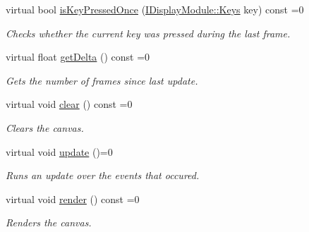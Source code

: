 \begin{DoxyCompactItemize}
virtual bool \mbox{\hyperlink{classArcade_1_1Display_1_1IDisplayModule_a531b700b332e077d9b714bafac05ebe1}{is\+Key\+Pressed\+Once}} (\mbox{\hyperlink{classArcade_1_1Display_1_1IDisplayModule_a8da3f6b309ca0581473ae8cc8789b619}{I\+Display\+Module\+::\+Keys}} key) const =0
\begin{DoxyCompactList}\small\item\em Checks whether the current key was pressed during the last frame. \end{DoxyCompactList}\item 
virtual float \mbox{\hyperlink{classArcade_1_1Display_1_1IDisplayModule_aab078d82e6fdd32682553947c20226ac}{get\+Delta}} () const =0
\begin{DoxyCompactList}\small\item\em Gets the number of frames since last update. \end{DoxyCompactList}\item 
\mbox{\label{classArcade_1_1Display_1_1IDisplayModule_a4892b758c6710f45d4dcebe70f801639}} 
virtual void \mbox{\hyperlink{classArcade_1_1Display_1_1IDisplayModule_a4892b758c6710f45d4dcebe70f801639}{clear}} () const =0
\begin{DoxyCompactList}\small\item\em Clears the canvas. \end{DoxyCompactList}\item 
\mbox{\label{classArcade_1_1Display_1_1IDisplayModule_a1ca0c1052dccb78eb470e36e6f557e60}} 
virtual void \mbox{\hyperlink{classArcade_1_1Display_1_1IDisplayModule_a1ca0c1052dccb78eb470e36e6f557e60}{update}} ()=0
\begin{DoxyCompactList}\small\item\em Runs an update over the events that occured. \end{DoxyCompactList}\item 
\mbox{\label{classArcade_1_1Display_1_1IDisplayModule_a012f5804e7dc45515ef8e85e7ca8de5a}} 
virtual void \mbox{\hyperlink{classArcade_1_1Display_1_1IDisplayModule_a012f5804e7dc45515ef8e85e7ca8de5a}{render}} () const =0
\begin{DoxyCompactList}\small\item\em Renders the canvas. \end{DoxyCompactList}\item 

\end{DoxyCompactItemize}
